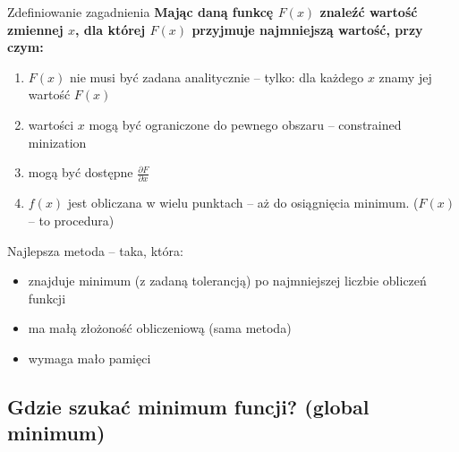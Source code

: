   \begin{frame}
    \begin{block}{Zdefiniowanie zagadnienia}
      \textbf{Mając daną funkcę $ F(x) $ znaleźć wartość
      zmiennej $ x $, dla której $ F(x) $ przyjmuje
      najmniejszą wartość, przy czym:}
      \begin{enumerate}
        \item $ F(x) $ nie musi być zadana analitycznie --
        tylko: dla każdego $ x $ znamy jej wartość $ F(x) $
        \item wartości $ x $ mogą być ograniczone do pewnego
        obszaru -- constrained minization
        \item mogą być dostępne $ \frac{\partial F}{\partial x} $
        \item $ f(x) $ jest obliczana w wielu punktach --
        aż do osiągnięcia minimum. ($ F(x) $ -- to procedura)
      \end{enumerate}
    \end{block}

  \end{frame}

  \begin{frame}
    \begin{block}{Najlepsza metoda -- taka, która:}
      \begin{itemize}
        \item znajduje minimum (z zadaną tolerancją)
        po najmniejszej liczbie obliczeń funkcji
        \item ma małą złożoność obliczeniową (sama
        metoda)
        \item wymaga mało pamięci
      \end{itemize}

    \end{block}

  \end{frame}

\subsection{Gdzie szukać minimum funcji? (global minimum)}

